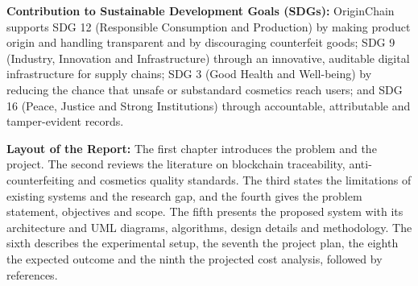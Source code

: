 \documentclass[12pt,a4paper]{report}
\begin{document}
{\vspace{0.25cm}
\noindent \textbf{Contribution to Sustainable Development Goals (SDGs):} OriginChain supports SDG 12 (Responsible Consumption and Production) by making product origin and handling transparent and by discouraging counterfeit goods; SDG 9 (Industry, Innovation and Infrastructure) through an innovative, auditable digital infrastructure for supply chains; SDG 3 (Good Health and Well-being) by reducing the chance that unsafe or substandard cosmetics reach users; and SDG 16 (Peace, Justice and Strong Institutions) through accountable, attributable and tamper-evident records.

\vspace{0.25cm}
\noindent \textbf{Layout of the Report:} The first chapter introduces the problem and the project. The second reviews the literature on blockchain traceability, anti-counterfeiting and cosmetics quality standards. The third states the limitations of existing systems and the research gap, and the fourth gives the problem statement, objectives and scope. The fifth presents the proposed system with its architecture and UML diagrams, algorithms, design details and methodology. The sixth describes the experimental setup, the seventh the project plan, the eighth the expected outcome and the ninth the projected cost analysis, followed by references.
\par}

\newpage
\tableofcontents

\newpage
\listoffigures
\vspace{0.8cm}
\listoftables
\end{document}
